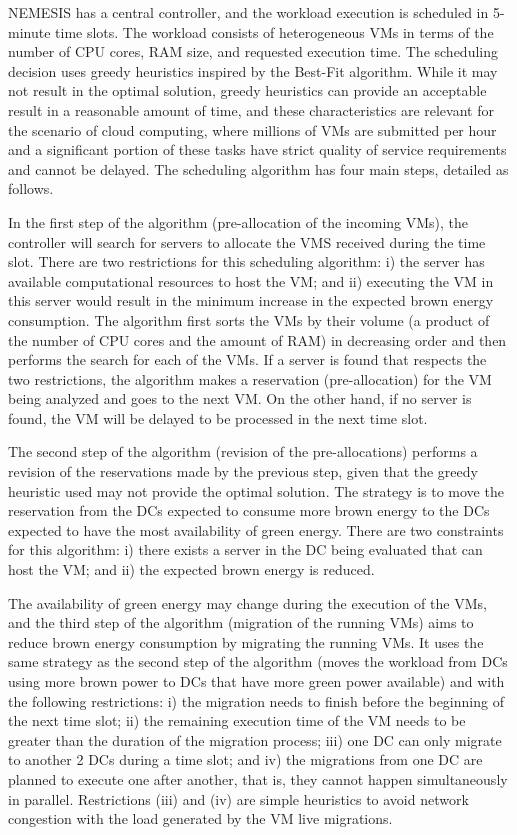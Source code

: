 NEMESIS has a central controller, and the workload execution is scheduled in 5-minute time slots. The workload consists of heterogeneous VMs in terms of the number of CPU cores, RAM size, and requested execution time. The scheduling decision uses greedy heuristics inspired by the Best-Fit algorithm. While it may not result in the optimal solution, greedy heuristics can provide an acceptable result in a reasonable amount of time, and these characteristics are relevant for the scenario of cloud computing, where millions of VMs are submitted per hour and a significant portion of these tasks have strict quality of service requirements and cannot be delayed. The scheduling algorithm has four main steps, detailed as follows.

In the first step of the algorithm (pre-allocation of the incoming VMs), the controller will search for servers to allocate the VMS received during the time slot. There are two restrictions for this scheduling algorithm: i) the server has available computational resources to host the VM;  and ii) executing the VM in this server would result in the minimum increase in the expected brown energy consumption. The algorithm first sorts the VMs by their volume (a product of the number of CPU cores and the amount of RAM) in decreasing order and then performs the search for each of the VMs. If a server is found that respects the two restrictions, the algorithm makes a reservation (pre-allocation) for the VM being analyzed and goes to the next VM. On the other hand, if no server is found, the VM will be delayed to be processed in the next time slot.

The second step of the algorithm (revision of the pre-allocations) performs a revision of the reservations made by the previous step, given that the greedy heuristic used may not provide the optimal solution.  The strategy is to move the reservation from the DCs expected to consume more brown energy to the DCs expected to have the most availability of green energy.  There are two constraints for this algorithm: i) there exists a server in the DC being evaluated that can host the VM; and ii) the expected brown energy is reduced.

The availability of green energy may change during the execution of the VMs, and the third step of the algorithm (migration of the running VMs) aims to reduce brown energy consumption by migrating the running VMs. It uses the same strategy as the second step of the algorithm (moves the workload from DCs using more brown power to DCs that have more green power available) and with the following restrictions: i) the migration needs to finish before the beginning of the next time slot; ii) the remaining execution time of the VM needs to be greater than the duration of the migration process; iii) one DC can only migrate to another 2 DCs during a time slot; and iv) the migrations from one DC are planned to execute one after another, that is, they cannot happen simultaneously in parallel. Restrictions (iii) and (iv) are simple heuristics to avoid network congestion with the load generated by the VM live migrations.

